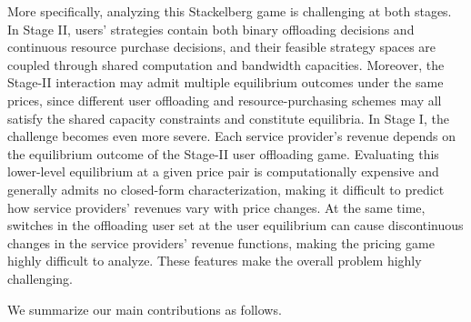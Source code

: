 \documentclass[lettersize,journal]{IEEEtran}
\begin{document}
More specifically, analyzing this Stackelberg game is challenging at both stages. In Stage II, users’ strategies contain both binary offloading decisions and continuous resource purchase decisions, and their feasible strategy spaces are coupled through shared computation and bandwidth capacities. Moreover, the Stage-II interaction may admit multiple equilibrium outcomes under the same prices, since different user offloading and resource-purchasing schemes may all satisfy the shared capacity constraints and constitute equilibria. In Stage I, the challenge becomes even more severe. Each service provider’s revenue depends on the equilibrium outcome of the Stage-II user offloading game. Evaluating this lower-level equilibrium at a given price pair is computationally expensive and generally admits no closed-form characterization, making it difficult to predict how service providers’ revenues vary with price changes. At the same time, switches in the offloading user set at the user equilibrium can cause discontinuous changes in the service providers’ revenue functions, making the pricing game highly difficult to analyze. These features make the overall problem highly challenging.

We summarize our main contributions as follows.
\end{document}
